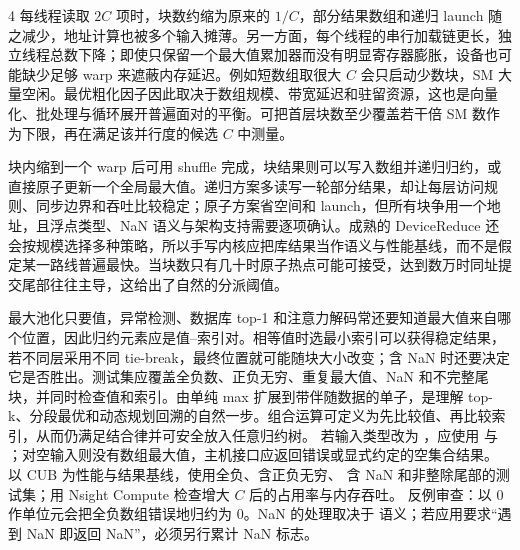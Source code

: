 \begin{solutionexercise}{4}
每线程读取 $2C$ 项时，块数约缩为原来的 $1/C$，部分结果数组和递归 launch 随之减少，地址计算也被多个输入摊薄。另一方面，每个线程的串行加载链更长，独立线程总数下降；即使只保留一个最大值累加器而没有明显寄存器膨胀，设备也可能缺少足够 warp 来遮蔽内存延迟。例如短数组取很大 $C$ 会只启动少数块，SM 大量空闲。最优粗化因子因此取决于数组规模、带宽延迟和驻留资源，这也是向量化、批处理与循环展开普遍面对的平衡。可把首层块数至少覆盖若干倍 SM 数作为下限，再在满足该并行度的候选 $C$ 中测量。

块内缩到一个 warp 后可用 shuffle 完成，块结果则可以写入数组并递归归约，或直接原子更新一个全局最大值。递归方案多读写一轮部分结果，却让每层访问规则、同步边界和吞吐比较稳定；原子方案省空间和 launch，但所有块争用一个地址，且浮点类型、NaN 语义与架构支持需要逐项确认。成熟的 DeviceReduce 还会按规模选择多种策略，所以手写内核应把库结果当作语义与性能基线，而不是假定某一路线普遍最快。当块数只有几十时原子热点可能可接受，达到数万时同址提交尾部往往主导，这给出了自然的分派阈值。

最大池化只要值，异常检测、数据库 top-1 和注意力解码常还要知道最大值来自哪个位置，因此归约元素应是值--索引对。相等值时选最小索引可以获得稳定结果，若不同层采用不同 tie-break，最终位置就可能随块大小改变；含 NaN 时还要决定它是否胜出。测试集应覆盖全负数、正负无穷、重复最大值、NaN 和不完整尾块，并同时检查值和索引。由单纯 max 扩展到带伴随数据的单子，是理解 top-k、分段最优和动态规划回溯的自然一步。组合运算可定义为先比较值、再比较索引，从而仍满足结合律并可安全放入任意归约树。
\variantheading 若输入类型改为 ，应使用  与
；对空输入则没有数组最大值，主机接口应返回错误或显式约定的空集合结果。
\practiceheading 以 CUB  为性能与结果基线，使用全负、含正负无穷、
含 NaN 和非整除尾部的测试集；用 Nsight Compute 检查增大 $C$ 后的占用率与内存吞吐。
反例审查：以 0 作单位元会把全负数组错误地归约为 0。NaN 的处理取决于 
语义；若应用要求“遇到 NaN 即返回 NaN”，必须另行累计 NaN 标志。
\end{solutionexercise}

